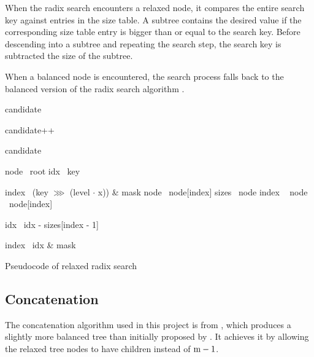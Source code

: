When the radix search encounters a relaxed node, it compares the entire search key against entries in the size table. A subtree contains the desired value if the corresponding size table entry is bigger than or equal to the search key. Before descending into a subtree and repeating the search step, the search key is subtracted the size of the subtree.

When a balanced node is encountered, the search process falls back to the balanced version of the radix search algorithm .

\begin{listing}[!ht]

    \begin{algorithmic}[1]
            \State candidate 

                \State candidate++
            \EndIf

            \State \Return candidate
        \EndFunction

        \State

            \State node \la\ root
            \State idx \la\ key

                    \State index \la\ (key $\ggg$ (level $\cdot$ x)) \& mask
                    \State node \la\ node[index]
                \Else
                    \State sizes \la\ node
                    \State index \la\ 
                    \State node \la\ node[index]

                        \State idx \la\ idx - sizes[index - 1]
                    \EndIf
                \EndIf
            \EndFor

            \State index \la\ idx \& mask
            \State {}
        \EndFunction
    \end{algorithmic}

    \caption{Pseudocode of relaxed radix search}
    \label{lst:rrb-tree-relaxed-radix-search}
\end{listing}

\subsection{Concatenation}
The concatenation algorithm used in this project is from \cite{rrb-vector-practical-general-purpose-im-sequence}, which produces a slightly more balanced tree than initially proposed by \cite{efficient-immutable-vectors}. It achieves it by allowing the relaxed tree nodes to have \m{} children instead of $\m{} - 1$.

